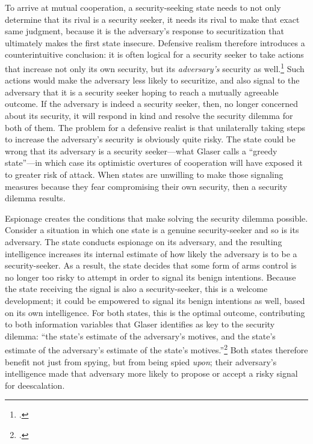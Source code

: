 \documentclass[14pt]{extarticle}
\begin{document}
To arrive at mutual cooperation, a security-seeking state needs to not only determine that its rival is a security seeker, it needs its rival to make that exact same judgment, because it is the adversary's response to securitization that ultimately makes the first state insecure. Defensive realism therefore introduces a counterintuitive conclusion: it is often logical for a security seeker to take actions that increase not only its own security, but its \emph{adversary's} security as well.\footcite[p.~7]{glaser_rational_2010} Such actions would make the adversary less likely to securitize, and also signal to the adversary that it is a security seeker hoping to reach a mutually agreeable outcome. If the adversary is indeed a security seeker, then, no longer concerned about its security, it will respond in kind and resolve the security dilemma for both of them. The problem for a defensive realist is that unilaterally taking steps to increase the adversary's security is obviously quite risky. The state could be wrong that its adversary is a security seeker---what Glaser calls a \enquote{greedy state}---in which case its optimistic overtures of cooperation will have exposed it to greater risk of attack. When states are unwilling to make those signaling measures because they fear compromising their own security, then a security dilemma results.

Espionage creates the conditions that make solving the security dilemma possible. Consider a situation in which one state is a genuine security-seeker and so is its adversary. The state conducts espionage on its adversary, and the resulting intelligence increases its internal estimate of how likely the adversary is to be a security-seeker. As a result, the state decides that some form of arms control is no longer too risky to attempt in order to signal its benign intentions. Because the state receiving the signal is also a security-seeker, this is a welcome development; it could be empowered to signal its benign intentions as well, based on its own intelligence. For both states, this is the optimal outcome, contributing to both information variables that Glaser identifies as key to the security dilemma: \enquote{the state’s estimate of the adversary’s motives, and the state’s estimate of the adversary’s estimate of the state’s motives.}\footcite[p.~34-35]{glaser_rational_2010} Both states therefore benefit not just from spying, but from being spied \emph{upon}; their adversary's intelligence made that adversary more likely to propose or accept a risky signal for deescalation.
\end{document}
